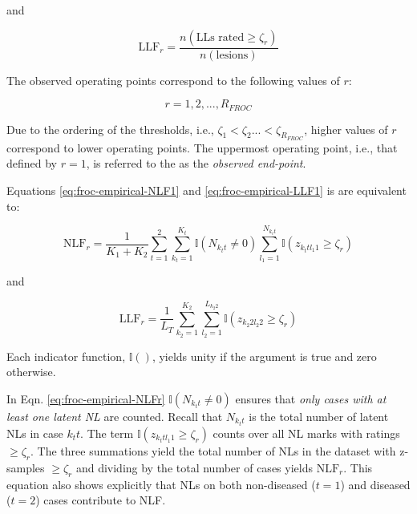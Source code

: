 \documentclass[
]{book}
\begin{document}
and

\begin{equation}
\text{LLF}_r  = \frac{n\left ( \text{LLs rated} \geq \zeta_r\right )}{n\left ( \text{lesions} \right )}
\label{eq:froc-empirical-LLF1}
\end{equation}

The observed operating points correspond to the following values of \(r\):

\begin{equation}
r = 1, 2, ...,R_{FROC} 
\label{eq:froc-empirical-range-r}
\end{equation}

Due to the ordering of the thresholds, i.e., \(\zeta_1 < \zeta_2 ... < \zeta_{R_{FROC}}\), higher values of \(r\) correspond to lower operating points. The uppermost operating point, i.e., that defined by \(r = 1\), is referred to the as the \emph{observed end-point}.

Equations \eqref{eq:froc-empirical-NLF1} and \eqref{eq:froc-empirical-LLF1} is are equivalent to:

\begin{equation}
\text{NLF}_r  = \frac{1}{K_1+K_2} \sum_{t=1}^{2} \sum_{k_t=1}^{K_t} \mathbb{I} \left ( N_{k_t t} \neq 0 \right )\sum_{l_1=1}^{N_{k_t t}} \mathbb{I} \left ( z_{k_t t l_1 1} \geq \zeta_r \right ) 
\label{eq:froc-empirical-NLFr}
\end{equation}

and

\begin{equation}
\text{LLF}_r  = \frac{1}{L_T} \sum_{k_2=1}^{K_2} \sum_{l_2=1}^{L_{k_2 2}} \mathbb{I} \left ( z_{k_2 2 l_2 2} \geq \zeta_r  \right ) 
\label{eq:froc-empirical-LLFr}
\end{equation}

Each indicator function, \(\mathbb{I}()\), yields unity if the argument is true and zero otherwise.

In Eqn. \eqref{eq:froc-empirical-NLFr} \(\mathbb{I} \left ( N_{k_t t} \neq 0 \right )\) ensures that \emph{only cases with at least one latent NL} are counted. Recall that \(N_{k_t t}\) is the total number of latent NLs in case \(k_t t\). The term \(\mathbb{I} \left ( z_{k_t t l_1 1} \geq \zeta_r \right )\) counts over all NL marks with ratings \(\geq \zeta_r\). The three summations yield the total number of NLs in the dataset with z-samples \(\geq \zeta_r\) and dividing by the total number of cases yields \(\text{NLF}_r\). This equation also shows explicitly that NLs on both non-diseased (\(t=1\)) and diseased (\(t=2\)) cases contribute to NLF.
\end{document}
